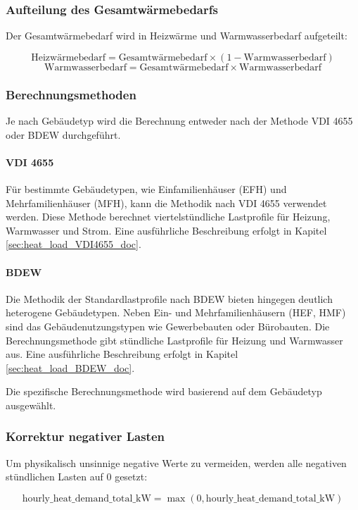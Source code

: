 \documentclass[a4paper,12pt]{article}
\begin{document}
\subsubsection{Aufteilung des Gesamtwärmebedarfs}

Der Gesamtwärmebedarf wird in Heizwärme und Warmwasserbedarf aufgeteilt:

\[
\text{Heizwärmebedarf} = \text{Gesamtwärmebedarf} \times (1 - \text{Warmwasserbedarf})
\]
\[
\text{Warmwasserbedarf} = \text{Gesamtwärmebedarf} \times \text{Warmwasserbedarf}
\]

\subsubsection{Berechnungsmethoden}
Je nach Gebäudetyp wird die Berechnung entweder nach der Methode VDI 4655 oder BDEW durchgeführt.

\paragraph{VDI 4655}
Für bestimmte Gebäudetypen, wie Einfamilienhäuser (EFH) und Mehrfamilienhäuser (MFH), kann die Methodik nach VDI 4655 verwendet werden. Diese Methode berechnet viertelstündliche Lastprofile für Heizung, Warmwasser und Strom. Eine ausführliche Beschreibung erfolgt in Kapitel \ref{sec:heat_load_VDI4655_doc}.

\paragraph{BDEW}
Die Methodik der Standardlastprofile nach BDEW bieten hingegen deutlich heterogene Gebäudetypen. Neben Ein- und Mehrfamilienhäusern (HEF, HMF) sind das Gebäudenutzungstypen wie Gewerbebauten oder Bürobauten. Die Berechnungsmethode gibt stündliche Lastprofile für Heizung und Warmwasser aus. Eine ausführliche Beschreibung erfolgt in Kapitel \ref{sec:heat_load_BDEW_doc}.

Die spezifische Berechnungsmethode wird basierend auf dem Gebäudetyp ausgewählt.

\subsubsection{Korrektur negativer Lasten}
Um physikalisch unsinnige negative Werte zu vermeiden, werden alle negativen stündlichen Lasten auf 0 gesetzt:

\[
\text{hourly\_heat\_demand\_total\_kW} = \max(0, \text{hourly\_heat\_demand\_total\_kW})
\]
\end{document}
